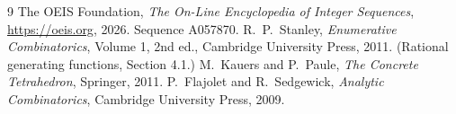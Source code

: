 \documentclass[11pt,a4paper]{article}
\theoremstyle{plain}
\theoremstyle{definition}
\begin{document}
\begin{thebibliography}{9}
 The OEIS Foundation, \emph{The On-Line Encyclopedia of Integer
Sequences}, \url{https://oeis.org}, 2026. Sequence A057870.
 R.~P.~Stanley, \emph{Enumerative Combinatorics}, Volume 1, 2nd ed.,
Cambridge University Press, 2011. (Rational generating functions, Section 4.1.)
 M.~Kauers and P.~Paule, \emph{The Concrete Tetrahedron}, Springer, 2011.
 P.~Flajolet and R.~Sedgewick, \emph{Analytic Combinatorics}, Cambridge
University Press, 2009.
\end{thebibliography}
\end{document}
